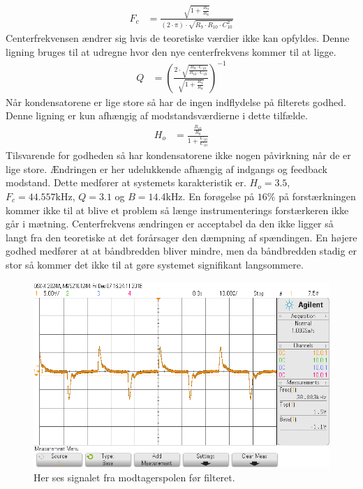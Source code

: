 \begin{align}
	F_c & = \frac{\sqrt{1+\frac{R_9}{R_8}}}{\left( 2 \cdot \pi \right) \cdot \sqrt{R_9 \cdot R_{10} \cdot C_{10}^2}}
	\end{align}
Centerfrekvensen ændrer sig hvis de teoretiske værdier ikke kan opfyldes. Denne ligning bruges til at udregne hvor den nye centerfrekvens kommer til at ligge.
\begin{align}
	Q & = \left( \frac{2 \cdot \sqrt{\frac{R_9 \cdot C_{10}}{R_{10} \cdot C_{10}}}}{\sqrt{1+\frac{R_9}{R_8}}} \right)^{-1}
	\end{align}
Når kondensatorene er lige store så har de ingen indflydelse på filterets godhed. Denne ligning er kun afhængig af modstandsværdierne i dette tilfælde.
\begin{align}
	H_o & = \frac{\frac{R_{10}}{R_8}}{1+\frac{C_{10}}{C_{10}}}
\end{align}
Tilsvarende for godheden så har kondensatorene ikke nogen påvirkning når de er lige store.
Ændringen er her udelukkende afhængig af indgangs og feedback modstand.
Dette medfører at systemets karakteristik er. 
$H_o = 3.5$, $F_c = 44.557 \si{\kilo\hertz}$, $Q = 3.1$ og $B = 14.4 \si{\kilo\hertz}$. 
En forøgelse på $16 \%$ på forstærkningen kommer ikke til at blive et problem så længe instrumenterings forstærkeren ikke går i mætning. 
Centerfrekvens ændringen er acceptabel da den ikke ligger så langt fra den teoretiske at det forårsager den dæmpning af spændingen.
En højere godhed medfører at at båndbredden bliver mindre, men da båndbredden stadig er stor så kommer det ikke til at gøre systemet signifikant langsommere.

\begin{figure}[h!]
	\centering
	\includegraphics[width=1\textwidth]{billeder/filter_in_png.png}
	\caption{Her ses signalet fra modtagerspolen før filteret.}
	\label{fig:filter_in}
\end{figure}

